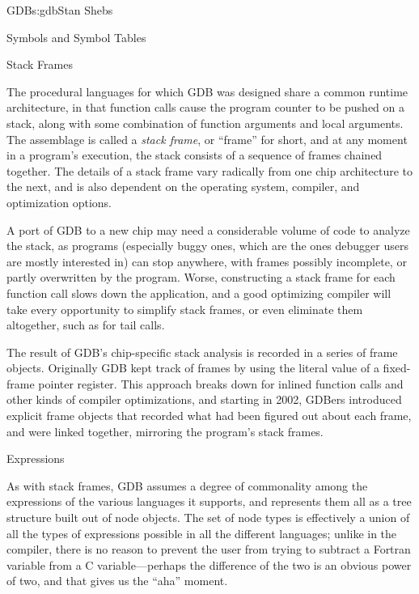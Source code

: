 \begin{aosachapter}{GDB}{s:gdb}{Stan Shebs}
\begin{aosasect2}{Symbols and Symbol Tables}
\end{aosasect2}

\begin{aosasect2}{Stack Frames}

The procedural languages for which GDB was designed share a common
runtime architecture, in that function calls cause the program counter
to be pushed on a stack, along with some combination of function
arguments and local arguments.  The assemblage is called a {\em stack
  frame}, or ``frame'' for short, and at any moment in a program's
execution, the stack consists of a sequence of frames chained
together.  The details of a stack frame vary radically from one chip
architecture to the next, and is also dependent on the operating
system, compiler, and optimization options.

A port of GDB to a new chip may need a considerable volume of code to
analyze the stack, as programs (especially buggy ones, which are the
ones debugger users are mostly interested in) can stop anywhere, with
frames possibly incomplete, or partly overwritten by the program.
Worse, constructing a stack frame for each function call slows down the
application, and a good optimizing compiler will take every
opportunity to simplify stack frames, or even eliminate them
altogether, such as for tail calls.

The result of GDB's chip-specific stack analysis is recorded in a
series of frame objects.  Originally GDB kept track of frames by using
the literal value of a fixed-frame pointer register.  This approach
breaks down for inlined function calls and other kinds of compiler
optimizations, and starting in 2002, GDBers introduced explicit frame
objects that recorded what had been figured out about each frame, and
were linked together, mirroring the program's stack frames.

\end{aosasect2}

\begin{aosasect2}{Expressions}

As with stack frames, GDB assumes a degree of commonality among the
expressions of the various languages it supports, and represents them
all as a tree structure built out of node objects.  The set of node
types is effectively a union of all the types of expressions possible
in all the different languages; unlike in the compiler, there is no
reason to prevent the user from trying to subtract a Fortran variable
from a C variable---perhaps the difference of the two is an obvious
power of two, and that gives us the ``aha'' moment.


\end{aosasect2}
\end{aosachapter}
